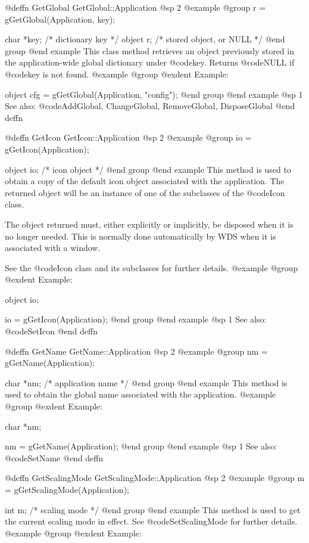 @deffn {GetGlobal} GetGlobal::Application
@sp 2
@example
@group
r = gGetGlobal(Application, key);

char    *key;   /*  dictionary key  */
object  r;      /*  stored object, or NULL  */
@end group
@end example
This class method retrieves an object previously stored in the
application-wide global dictionary under @code{key}.  Returns
@code{NULL} if @code{key} is not found.
@example
@group
@exdent Example:

object cfg = gGetGlobal(Application, "config");
@end group
@end example
@sp 1
See also:  @code{AddGlobal, ChangeGlobal, RemoveGlobal, DisposeGlobal}
@end deffn



@deffn {GetIcon} GetIcon::Application
@sp 2
@example
@group
io = gGetIcon(Application);

object  io;     /*  icon object  */
@end group
@end example
This method is used to obtain a copy of the default icon object
associated with the application.  The returned object will be an
instance of one of the subclasses of the @code{Icon} class.

The object returned must, either explicitly or implicitly, be
disposed when it is no longer needed.  This is normally done
automatically by WDS when it is associated with a window.

See the @code{Icon} class and its subclasses for further details.
@example
@group
@exdent Example:

object  io;

io = gGetIcon(Application);
@end group
@end example
@sp 1
See also:  @code{SetIcon}
@end deffn



@deffn {GetName} GetName::Application
@sp 2
@example
@group
nm = gGetName(Application);

char    *nm;    /*  application name  */
@end group
@end example
This method is used to obtain the global name associated with the application.
@example
@group
@exdent Example:

char    *nm;

nm = gGetName(Application);
@end group
@end example
@sp 1
See also:  @code{SetName}
@end deffn



@deffn {GetScalingMode} GetScalingMode::Application
@sp 2
@example
@group
m = gGetScalingMode(Application);

int     m;      /*  scaling mode   */
@end group
@end example
This method is used to get the current scaling mode in effect.
See @code{SetScalingMode} for further details.
@example
@group
@exdent Example:

